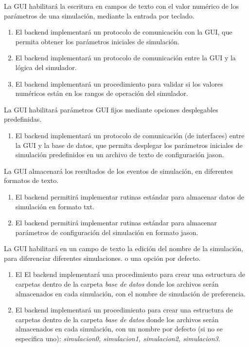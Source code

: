     
   La GUI habilitará la escritura en campos de texto con el valor numérico de los parámetros de una simulación, mediante la entrada por teclado.
    \begin{enumerate}
        \item El backend implementará un protocolo de comunicación con la GUI, que permita obtener los parámetros iniciales de simulación.
        \item El backend implementará un protocolo de comunicación entre la GUI y la lógica del simulador.
        \item El backend implementará un procedimiento para validar si los valores numéricos están en los rangos de operación del simulador.

    \end{enumerate}
    
    
    La GUI habilitará parámetros GUI fijos mediante opciones desplegables predefinidas.
    \begin{enumerate}
        \item  El backend implementará un protocolo de comunicación (de interfaces) entre la GUI y la base de datos, que permita desplegar los parámetros iniciales de simulación predefinidos en un archivo de texto de configuración jason.
    \end{enumerate}
   
    La GUI almacenará los resultados de los eventos de simulación, en diferentes formatos de texto.
    \begin{enumerate}
        \item El backend permitirá implementar rutinas estándar para almacenar datos de simulación en formato txt.
        \item El backend  permitirá implementar rutinas estándar para almacenar parámetros de configuración del simulación en formato jason.
    \end{enumerate}

    La GUI habilitará en un campo de texto la edición del nombre de la simulación, para diferenciar diferentes simulaciones. o una opción por defecto.
    \begin{enumerate}
        \item El  El backend  implementará una procedimiento para crear una estructura de carpetas dentro de la carpeta \textit{base de datos} donde los archivos serán almacenados en cada simulación, con el nombre de simulación de preferencia.
        \item El backend  implementará un procedimiento para crear una estructura de carpetas dentro de la carpeta \textit{base de datos} donde los archivos serán almacenados en cada simulación, con un nombre por defecto (si no se especifica uno): \textit{simulacion0, simulacion1, simulacion2, simulacion3}.
    \end{enumerate}
    

